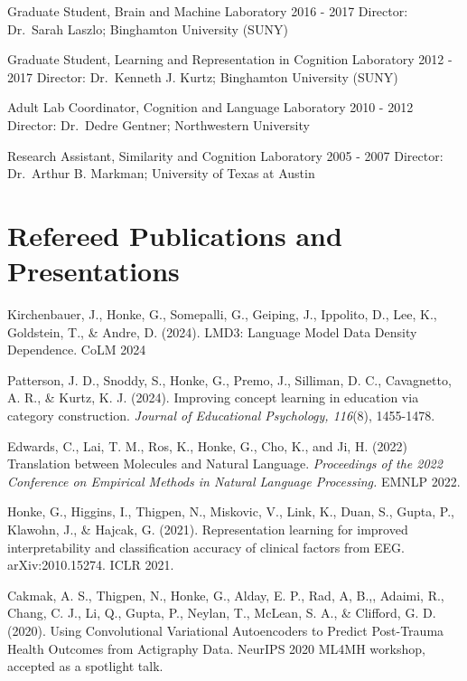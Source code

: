 \documentclass[11pt,]{article}
\begin{document}
Graduate Student, Brain and Machine Laboratory \hfill 2016 - 2017
\linebreak Director: Dr.~Sarah Laszlo; Binghamton University (SUNY)

Graduate Student, Learning and Representation in Cognition Laboratory
\hfill 2012 - 2017 \linebreak Director: Dr.~Kenneth J. Kurtz; Binghamton
University (SUNY)

Adult Lab Coordinator, Cognition and Language Laboratory \hfill 2010 -
2012 \linebreak Director: Dr.~Dedre Gentner; Northwestern University

Research Assistant, Similarity and Cognition Laboratory \hfill 2005 -
2007 \linebreak Director: Dr.~Arthur B. Markman; University of Texas at
Austin

\section{Refereed Publications and
Presentations}\label{refereed-publications-and-presentations}

Kirchenbauer, J., Honke, G., Somepalli, G., Geiping, J., Ippolito, D.,
Lee, K., Goldstein, T., \& Andre, D. (2024). LMD3: Language Model Data
Density Dependence. CoLM 2024

Patterson, J. D., Snoddy, S., Honke, G., Premo, J., Silliman, D. C.,
Cavagnetto, A. R., \& Kurtz, K. J. (2024). Improving concept learning in
education via category construction. \emph{Journal of Educational
Psychology, 116}(8), 1455-1478.

Edwards, C., Lai, T. M., Ros, K., Honke, G., Cho, K., and Ji, H. (2022)
Translation between Molecules and Natural Language. \emph{Proceedings of
the 2022 Conference on Empirical Methods in Natural Language
Processing.} EMNLP 2022.

Honke, G., Higgins, I., Thigpen, N., Miskovic, V., Link, K., Duan, S.,
Gupta, P., Klawohn, J., \& Hajcak, G. (2021). Representation learning
for improved interpretability and classification accuracy of clinical
factors from EEG. arXiv:2010.15274. ICLR 2021.

Cakmak, A. S., Thigpen, N., Honke, G., Alday, E. P., Rad, A, B.,,
Adaimi, R., Chang, C. J., Li, Q., Gupta, P., Neylan, T., McLean, S. A.,
\& Clifford, G. D. (2020). Using Convolutional Variational Autoencoders
to Predict Post-Trauma Health Outcomes from Actigraphy Data. NeurIPS
2020 ML4MH workshop, accepted as a spotlight talk.
\end{document}
